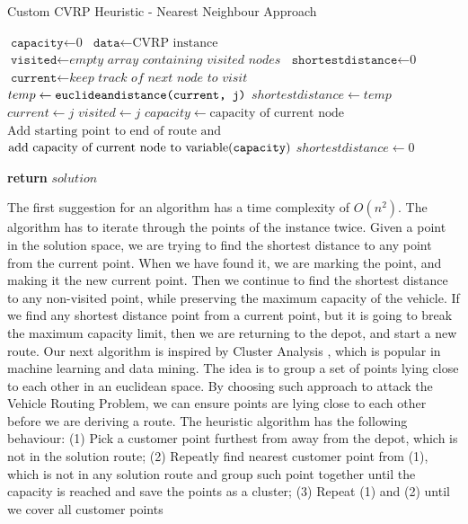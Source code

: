 \documentclass[12pt]{article}
\newcommand{\var}{\texttt}
\begin{document}
\begin{algorithm}
	\caption{Custom CVRP Heuristic - Nearest Neighbour Approach}\label{euclid}
	\begin{algorithmic}[1]
	\State $\var{capacity} \gets \text{0}$
	\State $\var{data} \gets \text{CVRP instance}$
	\State $\var{visited} \gets \textit{empty array containing visited nodes}$
	\State $\var{shortestdistance} \gets \textit{0}$
	\State $\var{current} \gets \textit{keep track of next node to visit}$
	\For{\texttt{$\var{i} \gets 0$ to $\text{length of data-1}$}}
		\For{\texttt{$\var{j} \gets 1$ to $\text{length of data}$}}
			\State $temp \gets \var{euclideandistance(\var{current}, \var{j})}$
					\State $shortestdistance \gets temp$
					\State $current \gets j$
					\State $visited \gets j$
					\newline{}
						\State $capacity \gets \text{capacity of current node}$					
					\Else
						\State $\text{Add starting point to end of route and}$
						\State $\text{add capacity of current node to variable(\var{capacity})}$
					\EndIf
				\EndIf
			\EndIf
		\EndFor
		\State $shortestdistance \gets 0$ 
	\EndFor

	\State \textbf{return} $solution$
	\EndFunction
	\end{algorithmic}
\end{algorithm}

The first suggestion for an algorithm has a time complexity of $O(n^2)$. The algorithm has to iterate through the points of the instance twice. 
Given a point in the solution space, we are trying to find the shortest distance to any point from the current point. When we have found it, we are marking the point,
and making it the new current point. Then we continue to find the shortest distance to any non-visited point, while preserving the maximum capacity of the vehicle. 
If we find any shortest distance point from a current point, but it is going to break the maximum capacity limit, then we are returning to the depot, and start a new route.
\newline
Our next algorithm is inspired by Cluster Analysis \cite{website:cluster-analysis}, which is popular in machine learning and data mining. 
The idea is to group a set of points lying close to each other in an euclidean space. 
By choosing such approach to attack the Vehicle Routing Problem, we can ensure points are lying close to each other before we are deriving a route.
\newline
The heuristic algorithm has the following behaviour: (1) Pick a customer point furthest from away from the depot, which is not in the solution route;
(2) Repeatly find nearest customer point from (1), which is not in any solution route and group such point together until the capacity is reached and save the points as a cluster; (3) Repeat (1) and (2) until we cover all customer points
\end{document}
